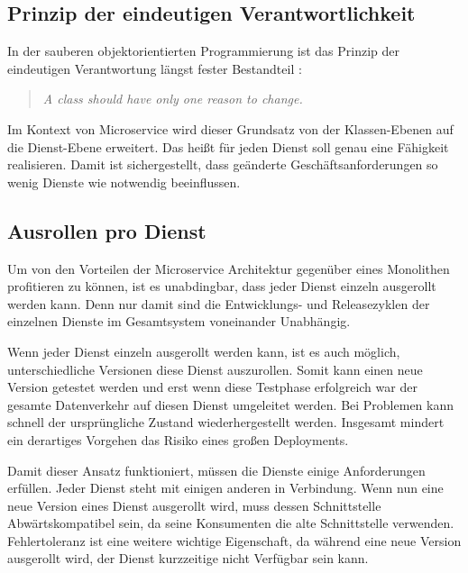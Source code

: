 \subsection{Prinzip der eindeutigen Verantwortlichkeit}

In der sauberen objektorientierten Programmierung ist das Prinzip der eindeutigen Verantwortung längst fester Bestandteil \cite{MartinAgile}:

\begin{english}
\begin{quote}
  \textit{A class should have only one reason to change.}
\end{quote}
\end{english}

Im Kontext von Microservice wird dieser Grundsatz von der Klassen-Ebenen auf die Dienst-Ebene erweitert. Das heißt für jeden Dienst soll genau eine Fähigkeit realisieren. Damit ist sichergestellt, dass geänderte Geschäftsanforderungen so wenig Dienste wie notwendig beeinflussen.

\subsection{Ausrollen pro Dienst}

Um von den Vorteilen der Microservice Architektur gegenüber eines Monolithen profitieren zu können, ist es unabdingbar, dass jeder Dienst einzeln ausgerollt werden kann. Denn nur damit sind die Entwicklungs- und Releasezyklen der einzelnen Dienste im Gesamtsystem voneinander Unabhängig.

Wenn jeder Dienst einzeln ausgerollt werden kann, ist es auch möglich, unterschiedliche Versionen diese Dienst auszurollen. Somit kann einen neue Version getestet werden und erst wenn diese Testphase erfolgreich war der gesamte Datenverkehr auf diesen Dienst umgeleitet werden. Bei Problemen kann schnell der ursprüngliche Zustand wiederhergestellt werden. Insgesamt mindert ein derartiges Vorgehen das Risiko eines großen Deployments.

Damit dieser Ansatz funktioniert, müssen die Dienste einige Anforderungen erfüllen. Jeder Dienst steht mit einigen anderen in Verbindung. Wenn nun eine neue Version eines Dienst ausgerollt wird, muss dessen Schnittstelle Abwärtskompatibel sein, da seine Konsumenten die alte Schnittstelle verwenden. Fehlertoleranz ist eine weitere wichtige Eigenschaft, da während eine neue Version ausgerollt wird, der Dienst kurzzeitige nicht Verfügbar sein kann.

